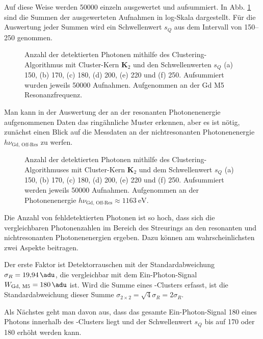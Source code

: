 \noindent
Auf diese Weise werden \SI{50000}{\captures} einzeln ausgewertet und aufsummiert. In Abb. \ref{fig:cl_2_150_170_180_200_220_250_resonance} sind die Summen der ausgewerteten Aufnahmen in log-Skala dargestellt. Für die Auswertung jeder Summen wird ein Schwellenwert $s_Q$ aus dem Intervall von \SIrange{150}{250}{\adu} genommen.
\begin{figure}[H]
    \centering
    
    \caption{Anzahl der detektierten Photonen mithilfe des Clustering-Algorithmus mit Cluster-Kern $\mathbf{K}_2$ und den Schwellenwerten $s_Q$ (a) \SI{150}{\adu}, (b) \SI{170}{\adu}, (c) \SI{180}{\adu}, (d) \SI{200}{\adu}, (e) \SI{220}{\adu} und (f) \SI{250}{\adu}. Aufsummiert wurden jeweils \num{50000} Aufnahmen. Aufgenommen an der Gd M5 Resonanzfrequenz.}
    \label{fig:cl_2_150_170_180_200_220_250_resonance}
\end{figure}
\noindent
Man kann in der Auswertung der an der resonanten Photonenenergie aufgenommenen Daten das ringähnliche Muster erkennen, aber es ist nötig, zunächst einen Blick auf die Messdaten an der nichtresonanten Photonenenergie $h\nu_\text{Gd, Off-Res}$ zu werfen.
\begin{figure}[H]
    \centering
    
    \caption{Anzahl der detektierten Photonen mithilfe des Clustering-Algorithmuses mit Cluster-Kern $\mathbf{K}_2$ und dem Schwellenwert $s_Q$ (a) \SI{150}{\adu}, (b) \SI{170}{\adu}, (c) \SI{180}{\adu}, (d) \SI{200}{\adu}, (e) \SI{220}{\adu} und (f) \SI{250}{\adu}. Aufsummiert werden jeweils \num{50000} Aufnahmen. Aufgenommen an der Photonenenergie $h\nu_\text{Gd, Off-Res} \approx \SI{1163}{\eV}$.}
    \label{fig:cl_150_170_180_200_220_250_off_resonance}
\end{figure}
\noindent
Die Anzahl von fehldetektierten Photonen ist so hoch, dass sich die vergleichbaren Photonenzahlen im Bereich des Streurings an den resonanten und nichtresonanten Photonenenergien ergeben. Dazu können am wahrscheinlichsten zwei Aspekte beitragen. 

\noindent
Der erste Faktor ist Detektorrauschen mit der Standardabweichung $\sigma_R = \SI{19.94}{\adu}$, die vergleichbar mit dem Ein-Photon-Signal $W_\text{Gd, M5} = \SI{180}{\adu}$ ist. Wird die Summe eines -Clusters erfasst, ist die Standardabweichung dieser Summe $\sigma_{2\times 2} = \sqrt{4}\sigma_R = 2\sigma_R$. 

\noindent
Als Nächstes geht man davon aus, dass das gesamte Ein-Photon-Signal \SI{180}{\adu} eines Photons innerhalb des -Clusters liegt und der Schwellenwert $s_Q$ bis auf \SI{170}{\adu} oder \SI{180}{\adu} erhöht werden kann.


